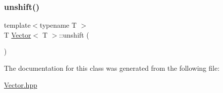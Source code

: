 \mbox{\label{classVector_a4fda2f9168cac24815062130bada9a8d}} 
\subsubsection{\texorpdfstring{unshift()}{unshift()}}
{\footnotesize\ttfamily template$<$typename T $>$ \\
T \hyperlink{classVector}{Vector}$<$ T $>$\+::unshift (\begin{DoxyParamCaption}{ }\end{DoxyParamCaption})}



The documentation for this class was generated from the following file\+:\begin{DoxyCompactItemize}
\item 
\hyperlink{Vector_8hpp}{Vector.\+hpp}\end{DoxyCompactItemize}
